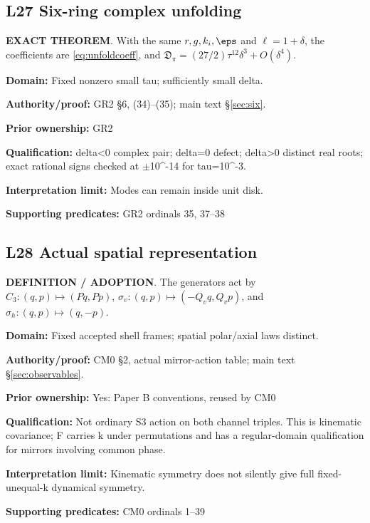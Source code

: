 \par\noindent\begin{minipage}{\linewidth}
\subsection*{L27 Six-ring complex unfolding}
\textbf{EXACT THEOREM}. With the same \(r,g,k_i,\eps\) and \(\ell=1+\delta\), the coefficients are \eqref{eq:unfoldcoeff}, and \(\mathfrak D_\pi=(27/2)\tau^{12}\delta^3+O(\delta^4)\).\par
\textbf{Domain:} Fixed nonzero small tau; sufficiently small delta.\par
\textbf{Authority/proof:} GR2 \S{}6, (34)--(35); main text \S\ref{sec:six}.\par
\textbf{Prior ownership:} GR2\par
\textbf{Qualification:} delta<0 complex pair; delta=0 defect; delta>0 distinct real roots; exact rational signs checked at $\pm$10\textasciicircum{}-14 for tau=10\textasciicircum{}-3.\par
\textbf{Interpretation limit:} Modes can remain inside unit disk.\par
\textbf{Supporting predicates:} GR2 ordinals 35, 37--38\par
\end{minipage}\par\medskip
\par\noindent\begin{minipage}{\linewidth}
\subsection*{L28 Actual spatial representation}
\textbf{DEFINITION / ADOPTION}. The generators act by \(C_3:(q,p)\mapsto(Pq,Pp)\), \(\sigma_v:(q,p)\mapsto(-Q_vq,Q_vp)\), and \(\sigma_h:(q,p)\mapsto(q,-p)\).\par
\textbf{Domain:} Fixed accepted shell frames; spatial polar/axial laws distinct.\par
\textbf{Authority/proof:} CM0 \S{}2, actual mirror-action table; main text \S\ref{sec:observables}.\par
\textbf{Prior ownership:} Yes: Paper B conventions, reused by CM0\par
\textbf{Qualification:} Not ordinary S3 action on both channel triples. This is kinematic covariance; F carries k under permutations and has a regular-domain qualification for mirrors involving common phase.\par
\textbf{Interpretation limit:} Kinematic symmetry does not silently give full fixed-unequal-k dynamical symmetry.\par
\textbf{Supporting predicates:} CM0 ordinals 1--39\par
\end{minipage}\par\medskip
